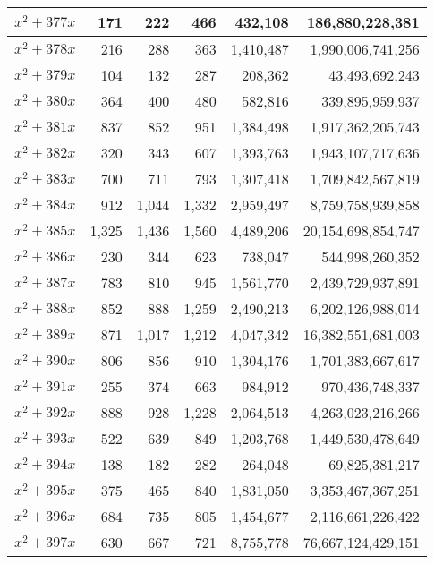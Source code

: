 \documentclass[a4paper]{amsproc}
\theoremstyle{plain}
\begin{document}
\begin{longtable}{ | l | r | r | r | r | r | }
$x^2 + 377x$ & 171 & 222 & 466 & 432{,}108 & 186{,}880{,}228{,}381 \\ \hline
$x^2 + 378x$ & 216 & 288 & 363 & 1{,}410{,}487 & 1{,}990{,}006{,}741{,}256 \\ \hline
$x^2 + 379x$ & 104 & 132 & 287 & 208{,}362 & 43{,}493{,}692{,}243 \\ \hline
$x^2 + 380x$ & 364 & 400 & 480 & 582{,}816 & 339{,}895{,}959{,}937 \\ \hline
$x^2 + 381x$ & 837 & 852 & 951 & 1{,}384{,}498 & 1{,}917{,}362{,}205{,}743 \\ \hline
$x^2 + 382x$ & 320 & 343 & 607 & 1{,}393{,}763 & 1{,}943{,}107{,}717{,}636 \\ \hline
$x^2 + 383x$ & 700 & 711 & 793 & 1{,}307{,}418 & 1{,}709{,}842{,}567{,}819 \\ \hline
$x^2 + 384x$ & 912 & 1{,}044 & 1{,}332 & 2{,}959{,}497 & 8{,}759{,}758{,}939{,}858 \\ \hline
$x^2 + 385x$ & 1{,}325 & 1{,}436 & 1{,}560 & 4{,}489{,}206 & 20{,}154{,}698{,}854{,}747 \\ \hline
$x^2 + 386x$ & 230 & 344 & 623 & 738{,}047 & 544{,}998{,}260{,}352 \\ \hline
$x^2 + 387x$ & 783 & 810 & 945 & 1{,}561{,}770 & 2{,}439{,}729{,}937{,}891 \\ \hline
$x^2 + 388x$ & 852 & 888 & 1{,}259 & 2{,}490{,}213 & 6{,}202{,}126{,}988{,}014 \\ \hline
$x^2 + 389x$ & 871 & 1{,}017 & 1{,}212 & 4{,}047{,}342 & 16{,}382{,}551{,}681{,}003 \\ \hline
$x^2 + 390x$ & 806 & 856 & 910 & 1{,}304{,}176 & 1{,}701{,}383{,}667{,}617 \\ \hline
$x^2 + 391x$ & 255 & 374 & 663 & 984{,}912 & 970{,}436{,}748{,}337 \\ \hline
$x^2 + 392x$ & 888 & 928 & 1{,}228 & 2{,}064{,}513 & 4{,}263{,}023{,}216{,}266 \\ \hline
$x^2 + 393x$ & 522 & 639 & 849 & 1{,}203{,}768 & 1{,}449{,}530{,}478{,}649 \\ \hline
$x^2 + 394x$ & 138 & 182 & 282 & 264{,}048 & 69{,}825{,}381{,}217 \\ \hline
$x^2 + 395x$ & 375 & 465 & 840 & 1{,}831{,}050 & 3{,}353{,}467{,}367{,}251 \\ \hline
$x^2 + 396x$ & 684 & 735 & 805 & 1{,}454{,}677 & 2{,}116{,}661{,}226{,}422 \\ \hline
$x^2 + 397x$ & 630 & 667 & 721 & 8{,}755{,}778 & 76{,}667{,}124{,}429{,}151 \\ \hline

\end{longtable}
\end{document}
